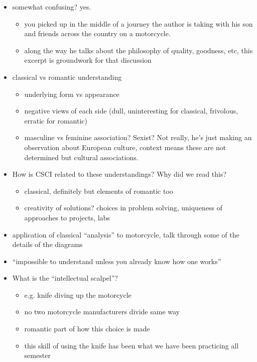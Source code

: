 \documentclass{article}
\begin{document}
\begin{itemize}
\item somewhat confusing? yes.
  \begin{itemize}
  \item you picked up in the middle of a journey the author is taking with his son
    and friends across the country on a motorcycle.
  \item along the way he talks about the philosophy of quality, goodness, etc,
    this excerpt is groundwork for that discussion
  \end{itemize}

\item classical vs romantic understanding
  \begin{itemize}
  \item underlying form vs appearance
  \item negative views of each side (dull, uninteresting for
    classical, frivolous, erratic for romantic)
  \item masculine vs feminine association? Sexist?  Not really, he's
    just making an observation about European culture, context means
    these are not determined but cultural associations.
  \end{itemize}
\item How is CSCI related to these understandings? Why did we read
  this?
  \begin{itemize}
  \item classical, definitely but elements of romantic too
  \item creativity of solutions?  choices in problem solving, uniqueness
    of approaches to projects, labs
  \end{itemize}
\item application of classical ``analysis'' to motorcycle, talk through
  some of the details of the diagrams
\item ``impossible to understand unless you already know how one works''
\item What is the ``intellectual scalpel''?
  \begin{itemize}
  \item e.g. knife diving up the motorcycle
  \item no two motorcycle manufacturers divide same way
  \item romantic part of how this choice is made
  \item this skill of using the knife has been what we have been
    practicing all semester
  \end{itemize}

\end{itemize}
\end{document}
